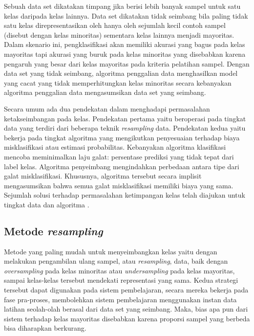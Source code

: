 \documentclass[12pt,a4paper,titlepage]{article}
\begin{document}
Sebuah data set dikatakan timpang jika berisi lebih banyak sampel untuk satu kelas daripada kelas lainnya. Data set dikatakan tidak seimbang bila paling tidak satu kelas direpresentasikan oleh hanya oleh sejumlah kecil contoh sampel (disebut dengan kelas minoritas) sementara kelas lainnya menjadi mayoritas. Dalam skenario ini, pengklasifikasi akan memiliki akurasi yang bagus pada kelas mayoritas tapi akurasi yang buruk pada kelas minoritas yang disebabkan karena pengaruh yang besar dari kelas mayoritas pada kriteria pelatihan sampel. Dengan data set yang tidak seimbang, algoritma penggalian data menghasilkan model yang cacat yang tidak memperhitungkan kelas minoritas secara kebanyakan algoritma penggalian data mengasumsikan data set yang seimbang.

Secara umum ada dua pendekatan dalam menghadapi permasalahan ketakseimbangan pada kelas. Pendekatan pertama yaitu beroperasi pada tingkat data yang terdiri dari beberapa teknik \textit{resampling} data. Pendekatan kedua yaitu bekerja pada tingkat algoritma yang mengikutkan penyesuaian terhadap biaya misklasifikasi atau estimasi probabilitas. Kebanyakan algoritma klasifikasi mencoba meminimalkan laju galat: persentase prediksi yang tidak tepat dari label kelas. Algoritma penyeimbang mengindahkan perbedaan antara tipe dari galat misklasifikasi. Khususnya, algoritma tersebut secara implisit mengasumsikan bahwa semua galat misklasifikasi memiliki biaya yang sama. Sejumlah solusi terhadap permasalahan ketimpangan kelas telah diajukan untuk tingkat data dan algoritma \cite{chawla2004editorial}.

\subsection{Metode \textit{resampling}}\label{subsec:metode-resampling}

Metode yang paling mudah untuk menyeimbangkan kelas yaitu dengan melakukan pengambilan ulang sampel, atau \textit{resampling}, data, baik dengan \textit{oversampling} pada kelas minoritas atau \textit{undersampling} pada kelas mayoritas, sampai kelas-kelas tersebut mendekati representasi yang sama. Kedua strategi tersebut dapat digunakan pada sistem pembelajaran, secara mereka bekerja pada fase pra-proses, membolehkan sistem pembelajaran menggunakan instan data latihan seolah-olah berasal dari data set yang seimbang. Maka, bias apa pun dari sistem terhadap kelas mayoritas disebabkan karena proporsi sampel yang berbeda bisa diharapkan berkurang.
\end{document}
